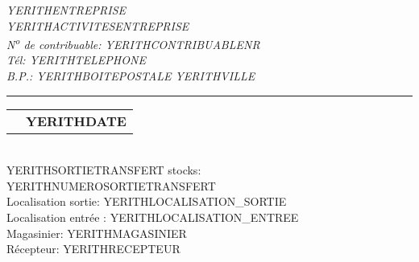 \documentclass[2pt]{article} %
\makeatletter
\newcommand{\headerrow}[2]
{\begin{tabular*}{\linewidth}{l@{\extracolsep{\fill}}r}
	#1 &
	#2 \\
\end{tabular*}}
\makeatother
\begin{document}
\emph{YERITHENTREPRISE} \\
\emph{YERITHACTIVITESENTREPRISE} \\
\emph{N\textsuperscript{o} de contribuable: YERITHCONTRIBUABLENR} \\
\emph{T\'el: YERITHTELEPHONE} \\
\emph{B.P.: YERITHBOITEPOSTALE YERITHVILLE}

\vspace*{0.2cm}

\hrule

\headerrow
{}
{\textbf{YERITHDATE}}\\

YERITHSORTIETRANSFERT stocks: YERITHNUMEROSORTIETRANSFERT\\
Localisation sortie: YERITHLOCALISATION_SORTIE\\
Localisation entr\'ee : YERITHLOCALISATION_ENTREE\\
Magasinier: YERITHMAGASINIER\\
R\'ecepteur: YERITHRECEPTEUR\\

\vspace*{0.2cm}

\end{document}
